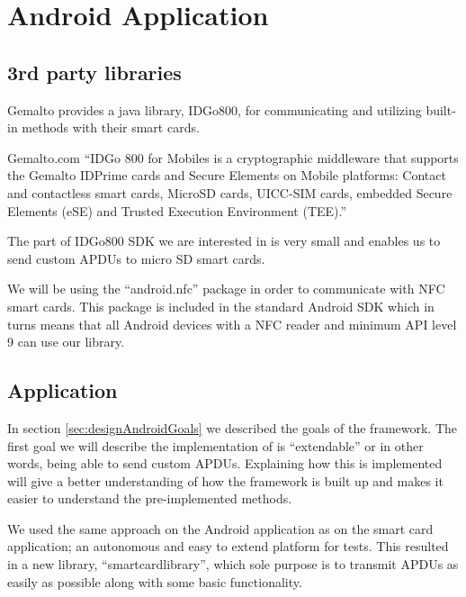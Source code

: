 \section{Android Application}

\subsection{3rd party libraries}
\label{sec:gemaltoApp}
Gemalto provides a java library, IDGo800, for communicating and utilizing built-in methods with their smart cards.

\begin{aquote}{Gemalto.com \cite{GemaltoIDGo800}}
``IDGo 800 for Mobiles is a cryptographic middleware that supports the Gemalto IDPrime cards and Secure Elements on Mobile platforms: Contact and contactless smart cards, MicroSD cards, UICC-SIM cards, embedded Secure Elements (eSE) and Trusted Execution Environment (TEE).''
\end{aquote}

The part of IDGo800 SDK we are interested in is very small and enables us to send custom APDUs to micro SD smart cards.

We will be using the ``android.nfc'' package in order to communicate with NFC smart cards. This package is included in the standard Android SDK which in turns means that all Android devices with a NFC reader and minimum API level 9 \cite{androidNFCminSDK} can use our library.

\subsection{Application}
\label{sec:androidApp}

In section \ref{sec:designAndroidGoals} we described the goals of the framework. The first goal we will describe the implementation of is ``extendable'' or in other words, being able to send custom APDUs. Explaining how this is implemented will give a better understanding of how the framework is built up and makes it easier to understand the pre-implemented methods.

We used the same approach on the Android application as on the smart card application; an autonomous and easy to extend platform for tests. This resulted in a new library, ``smartcardlibrary'',  which sole purpose is to transmit APDUs as easily as possible along with some basic functionality.

